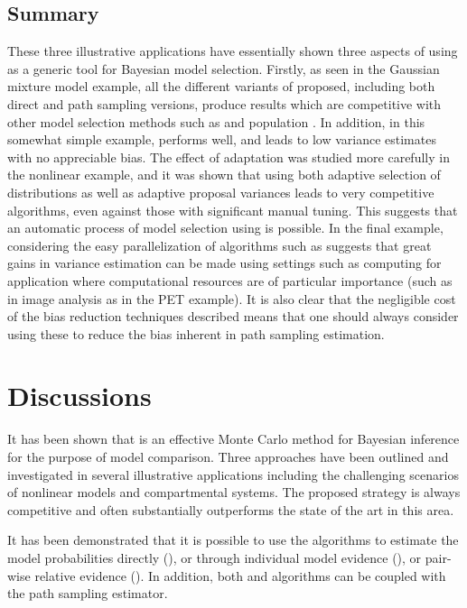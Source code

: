 \subsection{Summary}

These three illustrative applications have essentially shown three aspects of using \smc as a generic tool for Bayesian model selection. Firstly, as seen in the Gaussian mixture model example, all the different variants of \smc proposed, including both direct and path sampling versions, produce results which are competitive with other model selection methods such as \rjmcmc and population \mcmc. In addition, in this somewhat simple example, \smc[2] performs well, and leads to low variance estimates with no appreciable bias. The effect of adaptation was studied more carefully in the nonlinear \ode example, and it was shown that using both adaptive selection of distributions as well as adaptive proposal variances leads to very competitive algorithms, even against those with significant manual tuning. This suggests that an automatic process of model selection using \smc[2] is possible. In the final example, considering the easy parallelization of algorithms such as \smc[2] suggests that great gains in variance estimation can be made using settings such as \gpu computing for application where computational resources are of particular importance (such as in image analysis as in the PET example). It is also clear that the negligible cost of the bias reduction techniques described means that one should always consider using these to reduce the bias inherent in path sampling estimation.

\section{Discussions}
\label{sec:Bayesian SMC discussion}

It has been shown that \smc is an effective Monte Carlo method for Bayesian inference for the purpose of model comparison. Three approaches have been outlined and investigated in several illustrative applications including the challenging scenarios of nonlinear \ode models and \pet compartmental systems. The proposed strategy is always competitive and often substantially outperforms the state of the art in this area.

It has been demonstrated that it is possible to use the \smc algorithms to estimate the model probabilities directly (\smc[1]), or through individual model evidence (\smc[2]), or pair-wise relative evidence (\smc[3]). In addition, both \smc[2] and \smc[3] algorithms can be coupled with the path sampling estimator.

